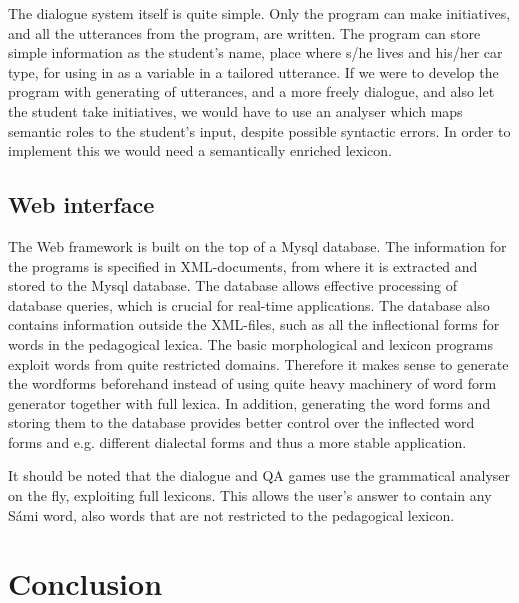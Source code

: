\documentclass[11pt]{article}
\begin{document}
The dialogue system itself is quite simple. Only
the program can make initiatives, and all the utterances from the program, are written. The program can store simple information as the student's name, place where s/he lives and his/her car type, for using in as a variable in a tailored utterance. If we were to develop the program with generating of utterances, and a more freely dialogue, and also let the student take initiatives, we would have to use an analyser which maps semantic roles to the student's input, despite possible syntactic errors. In order to implement this we would need a semantically enriched lexicon.



\subsection{Web interface}

The Web framework is built on the top of a Mysql database. The information for the programs is specified in XML-documents, from where it is extracted and stored to the Mysql database. The database allows effective processing of database queries, which is crucial for real-time applications. The database also contains information outside the XML-files, such as all the inflectional forms for words in the pedagogical lexica. The basic morphological and lexicon programs exploit words from quite restricted domains. Therefore it makes sense to generate the wordforms beforehand instead of using quite heavy machinery of word form generator together with full lexica. In addition, generating the word forms and storing them to the database provides better control over the inflected word forms and e.g. different dialectal forms and thus a more stable application.

It should be noted that 
the dialogue and QA games
 use the grammatical analyser on the fly, exploiting full lexicons. This allows the user's answer to contain any Sámi word, also words that are not restricted to the pedagogical lexicon.



\section{Conclusion}

\end{document}
